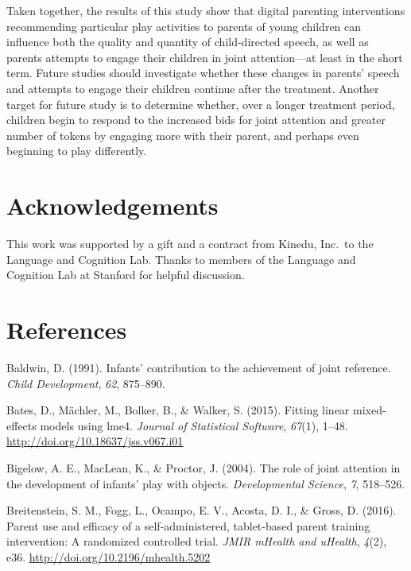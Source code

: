 \documentclass[man,floatsintext]{apa6}
\begin{document}
Taken together, the results of this study show that digital parenting interventions recommending particular play activities to parents of young children can influence both the quality and quantity of child-directed speech, as well as parents attempts to engage their children in joint attention---at least in the short term.
Future studies should investigate whether these changes in parents' speech and attempts to engage their children continue after the treatment.
Another target for future study is to determine whether, over a longer treatment period, children begin to respond to the increased bids for joint attention and greater number of tokens by engaging more with their parent, and perhaps even beginning to play differently.

\hypertarget{acknowledgements}{%
\section{Acknowledgements}\label{acknowledgements}}

This work was supported by a gift and a contract from Kinedu, Inc.~to the Language and Cognition Lab.
Thanks to members of the Language and Cognition Lab at Stanford for helpful discussion.

\newpage

\hypertarget{references}{%
\section{References}\label{references}}

\begingroup
\setlength{\parindent}{-0.5in}
\setlength{\leftskip}{0.5in}

\hypertarget{refs}{}
\leavevmode\hypertarget{ref-Baldwin1991}{}%
Baldwin, D. (1991). Infants' contribution to the achievement of joint reference. \emph{Child Development}, \emph{62}, 875--890.

\leavevmode\hypertarget{ref-lme4}{}%
Bates, D., Mächler, M., Bolker, B., \& Walker, S. (2015). Fitting linear mixed-effects models using lme4. \emph{Journal of Statistical Software}, \emph{67}(1), 1--48. \url{http://doi.org/10.18637/jss.v067.i01}

\leavevmode\hypertarget{ref-Bigelow2004}{}%
Bigelow, A. E., MacLean, K., \& Proctor, J. (2004). The role of joint attention in the development of infants' play with objects. \emph{Developmental Science}, \emph{7}, 518--526.

\leavevmode\hypertarget{ref-Breitenstein2016}{}%
Breitenstein, S. M., Fogg, L., Ocampo, E. V., Acosta, D. I., \& Gross, D. (2016). Parent use and efficacy of a self-administered, tablet-based parent training intervention: A randomized controlled trial. \emph{JMIR mHealth and uHealth}, \emph{4}(2), e36. \url{http://doi.org/10.2196/mhealth.5202}
\end{document}
